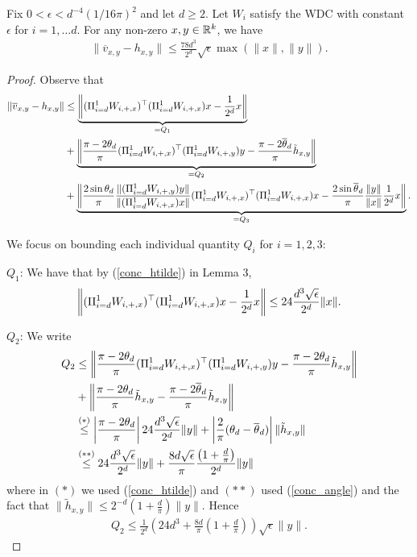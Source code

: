 \documentclass{article}
\begin{document}
\begin{lem}
Fix $0 < \epsilon < d^{-4}(1/16\pi)^2$ and let $d \geq 2$. Let $W_i$ satisfy the WDC with constant $\epsilon$ for $i = 1,\dots d$. For any non-zero $x,y \in \mathbb{R}^k$, we have \begin{align*}
\|\overline{v}_{x,y} - h_{x,y}\| \leq \frac{78d^3}{2^d}\sqrt{\epsilon}\max(\|x\|,\|y\|).
\end{align*}
\end{lem}
\begin{proof} Observe that \begin{align*}
\|\overline{v}_{x,y} - h_{x,y}\| & \leq \underbrace{\left\|(\Pi_{i=d}^1 W_{i,+,x})^\top(\Pi_{i=d}^1 W_{i,+,x})x - \frac{1}{2^d}x\right\|}_{= Q_1}\  \\
& + \underbrace{\left\|\frac{\pi - 2\theta_d}{\pi}(\Pi_{i=d}^1 W_{i,+,x})^\top(\Pi_{i=d}^1 W_{i,+,y})y - \frac{\pi - 2\overline{\theta}_d}{\pi}\tilde{h}_{x,y}\right\|}_{=Q_2}\ \\
& + \underbrace{\left\|\frac{2\sin \theta_d}{\pi}\frac{\|(\Pi_{i=d}^1 W_{i,+,y})y\|}{\|(\Pi_{i=d}^1 W_{i,+,x})x\|}(\Pi_{i=d}^1 W_{i,+,x})^\top(\Pi_{i=d}^1 W_{i,+,x})x - \frac{2\sin \overline{\theta}_d}{\pi} \frac{\|y\|}{\|x\|}\frac{1}{2^d}x\right\|}_{=Q_3}.
\end{align*}

We focus on bounding each individual quantity $Q_i$ for $i = 1,2,3$:

$Q_1$: We have that by (\ref{conc_htilde}) in Lemma 3, \begin{align}
\left\|(\Pi_{i=d}^1 W_{i,+,x})^\top(\Pi_{i=d}^1 W_{i,+,x})x - \frac{1}{2^d}x\right\| \leq 24 \frac{d^3 \sqrt{\epsilon}}{2^d}\|x\|.
\end{align}

$Q_2$: We write \begin{align*}
Q_2 & \leq \left\|\frac{\pi - 2\theta_d}{\pi}(\Pi_{i=d}^1 W_{i,+,x})^\top(\Pi_{i=d}^1 W_{i,+,y})y - \frac{\pi - 2\theta_d}{\pi}\tilde{h}_{x,y}\right\| \\
& + \left\|\frac{\pi - 2\theta_d}{\pi}\tilde{h}_{x,y} - \frac{\pi - 2\overline{\theta}_d}{\pi}\tilde{h}_{x,y}\right\| \\
& \stackrel{(*)}{\leq} \left|\frac{\pi - 2\theta_d}{\pi}\right|24 \frac{d^3\sqrt{\epsilon}}{2^d}\|y\| + \left|\frac{2}{\pi}(\theta_d - \overline{\theta}_d)\right|\|\tilde{h}_{x,y}\| \\
& \stackrel{(**)}{\leq} 24 \frac{d^3\sqrt{\epsilon}}{2^d}\|y\| + \frac{8d\sqrt{\epsilon}}{\pi}\frac{\left(1 + \frac{d}{\pi}\right)}{2^d}\|y\|
\end{align*} where in $(*)$ we used (\ref{conc_htilde}) and $(**)$ used (\ref{conc_angle}) and the fact that $\|\tilde{h}_{x,y}\| \leq 2^{-d}(1 + \frac{d}{\pi})\|y\|$. Hence \begin{align*}
Q_2 \leq \frac{1}{2^d} \left(24 d^3 + \frac{8d}{\pi}\left( 1+ \frac{d}{\pi}\right)\right)\sqrt{\epsilon}\|y\|.
\end{align*}


\end{proof}
\end{document}
